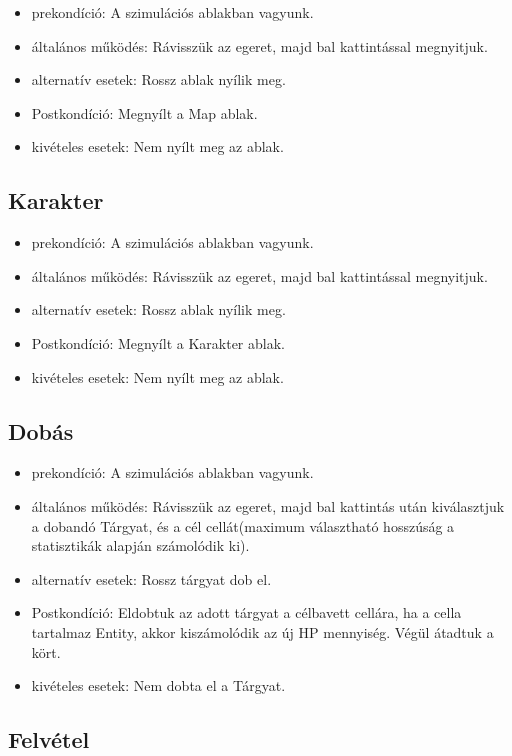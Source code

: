 \begin{itemize}
    \item prekondíció: A szimulációs ablakban vagyunk.
    \item általános működés: Rávisszük az egeret, majd bal kattintással megnyitjuk.
    \item alternatív esetek: Rossz ablak nyílik meg.
    \item Postkondíció: Megnyílt a Map ablak.
    \item kivételes esetek: Nem nyílt meg az ablak.
\end{itemize}

\subsection{Karakter}

\begin{itemize}
    \item prekondíció: A szimulációs ablakban vagyunk.
    \item általános működés: Rávisszük az egeret, majd bal kattintással megnyitjuk.
    \item alternatív esetek: Rossz ablak nyílik meg.
    \item Postkondíció: Megnyílt a Karakter ablak.
    \item kivételes esetek: Nem nyílt meg az ablak.
\end{itemize}

\subsection{Dobás}

\begin{itemize}
    \item prekondíció: A szimulációs ablakban vagyunk.
    \item általános működés: Rávisszük az egeret, majd bal kattintás után kiválasztjuk a dobandó Tárgyat, és a cél cellát(maximum választható hosszúság a statisztikák alapján számolódik ki).
    \item alternatív esetek: Rossz tárgyat dob el.
    \item Postkondíció: Eldobtuk az adott tárgyat a célbavett cellára, ha a cella tartalmaz Entity, akkor kiszámolódik az új HP mennyiség. Végül átadtuk a kört.
    \item kivételes esetek: Nem dobta el a Tárgyat.
\end{itemize}

\subsection{Felvétel}

